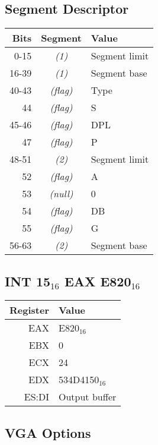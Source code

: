 \documentclass{article}
\begin{document}
\subsection{Segment Descriptor}
\label{gdt}

\begin{tabular}{|r|c|l|}
	\hline
	\textbf{Bits} & \textbf{Segment} & \textbf{Value} \\
	\hline
	0-15 & \emph{(1)} & Segment limit \\
	\hline
	16-39 & \emph{(1)} & Segment base \\
	\hline
	40-43 & \emph{(flag)} & Type \\
	\hline
	44 & \emph{(flag)} & S \\
	\hline
	45-46 & \emph{(flag)} & DPL \\
	\hline
	47 & \emph{(flag)} & P \\
	\hline
	48-51 & \emph{(2)} & Segment limit \\
	\hline
	52 & \emph{(flag)} & A \\
	\hline
	53 & \emph{(null)} & 0 \\
	\hline
	54 & \emph{(flag)} & DB \\
	\hline
	55 & \emph{(flag)} & G \\
	\hline
	56-63 & \emph{(2)} & Segment base \\
	\hline
\end{tabular}

\subsection{INT 15$_{16}$ EAX E820$_{16}$}
\label{int 15 0xe820}

\begin{tabular}{|r|l|}
	\hline
	\textbf{Register} & \textbf{Value} \\
	\hline
	EAX & E820$_{16}$ \\
	\hline
	EBX & 0 \\
	\hline
	ECX & 24 \\
	\hline
	EDX & 534D4150$_{16}$ \\
	\hline
	ES:DI & Output buffer \\
	\hline
\end{tabular}

\subsection{VGA Options}
\label{vga}
\end{document}
